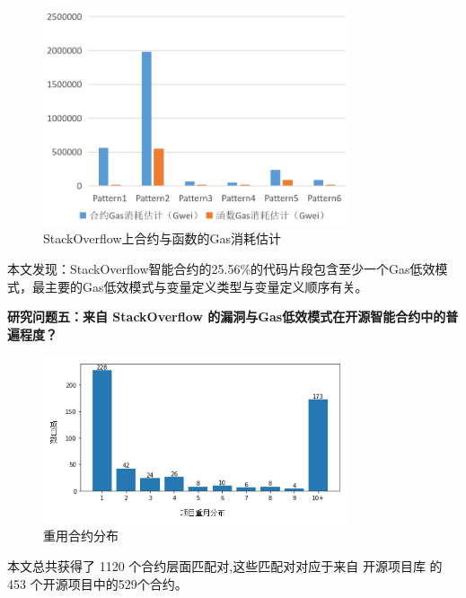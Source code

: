 \begin{figure}[hb]
\centering
\includegraphics[width=0.8\textwidth]{figures/gasGuess.png}
\caption{StackOverflow上合约与函数的Gas消耗估计}
\label{gasGuess}
\end{figure}

本文发现：StackOverflow智能合约的25.56\%的代码片段包含至少一个Gas低效模式，最主要的Gas低效模式与变量定义类型与变量定义顺序有关。

\textbf{研究问题五：来自 StackOverflow 的漏洞与Gas低效模式在开源智能合约中的普遍程度？}

\begin{figure}[ht]
\centering
\includegraphics[width=0.8\textwidth]{figures/proli_result.png}
\caption{重用合约分布}
\label{reuse_distribution}
\end{figure}

本文总共获得了 1120 个合约层面匹配对,这些匹配对对应于来自 开源项目库 的453 个开源项目中的529个合约。

